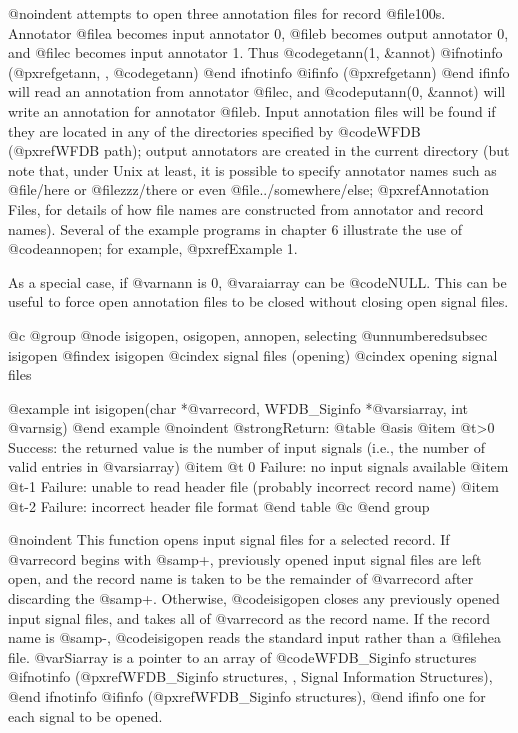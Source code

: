 {{{{{{{{@noindent
attempts to open three annotation files for record @file{100s}.
Annotator @file{a} becomes input annotator 0, @file{b} becomes output
annotator 0, and @file{c} becomes input annotator 1.  Thus
@code{getann(1, &annot)}
@ifnotinfo
(@pxref{getann, , @code{getann}})
@end ifnotinfo
@ifinfo
(@pxref{getann})
@end ifinfo
will read an annotation from annotator @file{c}, and
@code{putann(0, &annot)} will write an annotation for annotator @file{b}.
Input annotation files will be found if they are located in any of the
directories specified by @code{WFDB} (@pxref{WFDB path}); output annotators
are created in the current directory (but note that, under Unix at
least, it is possible to specify annotator names such as @file{/here} or
@file{zzz/there} or even @file{../somewhere/else}; @pxref{Annotation
Files}, for details of how file names are constructed from annotator and
record names).  Several of the example programs in chapter 6 illustrate
the use of @code{annopen}; for example, @pxref{Example 1}.

As a special case, if @var{nann} is 0, @var{aiarray} can be @code{NULL}.
This can be useful to force open annotation files to be closed without
closing open signal files.

@c @group
@node     isigopen, osigopen, annopen, selecting
@unnumberedsubsec isigopen
@findex isigopen
@cindex signal files (opening)
@cindex opening signal files

@example
int isigopen(char *@var{record}, WFDB_Siginfo *@var{siarray}, int @var{nsig})
@end example
@noindent
@strong{Return:}
@table @asis
@item @t{>0}
Success: the returned value is the number of input signals (i.e., the
number of valid entries in @var{siarray})
@item @t{ 0}
Failure: no input signals available
@item @t{-1}
Failure: unable to read header file (probably incorrect record name)
@item @t{-2}
Failure: incorrect header file format
@end table
@c @end group

@noindent
This function opens input signal files for a selected record.  If
@var{record} begins with @samp{+}, previously opened input signal files
are left open, and the record name is taken to be the remainder of
@var{record} after discarding the @samp{+}.  Otherwise, @code{isigopen}
closes any previously opened input signal files, and takes all of
@var{record} as the record name.  If the record name is @samp{-},
@code{isigopen} reads the standard input rather than a @file{hea}
file.  @var{Siarray} is a pointer to an array of @code{WFDB_Siginfo}
structures
@ifnotinfo
(@pxref{WFDB_Siginfo structures, , Signal Information Structures}),
@end ifnotinfo
@ifinfo
(@pxref{WFDB_Siginfo structures}),
@end ifinfo
one for each signal to be opened.

}}}}}}}}
